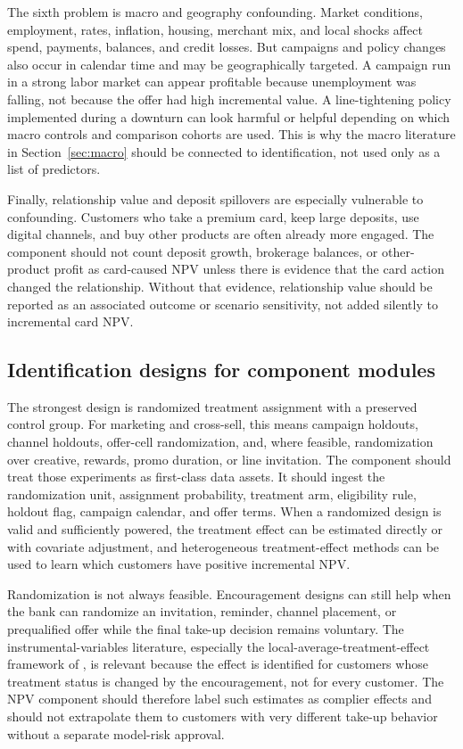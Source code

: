 \documentclass[11pt]{article}
\newcommand{\1}{\mathbf{1}}
\begin{document}
The sixth problem is macro and geography confounding. Market conditions,
employment, rates, inflation, housing, merchant mix, and local shocks affect
spend, payments, balances, and credit losses. But campaigns and policy changes
also occur in calendar time and may be geographically targeted. A campaign run
in a strong labor market can appear profitable because unemployment was falling,
not because the offer had high incremental value. A line-tightening policy
implemented during a downturn can look harmful or helpful depending on which
macro controls and comparison cohorts are used. This is why the macro
literature in Section~\ref{sec:macro} should be connected to identification,
not used only as a list of predictors.

Finally, relationship value and deposit spillovers are especially vulnerable
to confounding. Customers who take a premium card, keep large deposits, use
digital channels, and buy other products are often already more engaged. The
component should not count deposit growth, brokerage balances, or other-product
profit as card-caused NPV unless there is evidence that the card action changed
the relationship. Without that evidence, relationship value should be reported
as an associated outcome or scenario sensitivity, not added silently to
incremental card NPV.

\subsection{Identification designs for component modules}

The strongest design is randomized treatment assignment with a preserved
control group. For marketing and cross-sell, this means campaign holdouts,
channel holdouts, offer-cell randomization, and, where feasible, randomization
over creative, rewards, promo duration, or line invitation. The component
should treat those experiments as first-class data assets. It should ingest the
randomization unit, assignment probability, treatment arm, eligibility rule,
holdout flag, campaign calendar, and offer terms. When a randomized design is
valid and sufficiently powered, the treatment effect can be estimated directly
or with covariate adjustment, and heterogeneous treatment-effect methods can be
used to learn which customers have positive incremental NPV.

Randomization is not always feasible. Encouragement designs can still help
when the bank can randomize an invitation, reminder, channel placement, or
prequalified offer while the final take-up decision remains voluntary. The
instrumental-variables literature, especially the local-average-treatment-effect
framework of \citet{angristimbensrubin1996iv}, is relevant because the effect
is identified for customers whose treatment status is changed by the
encouragement, not for every customer. The NPV component should therefore label
such estimates as complier effects and should not extrapolate them to customers
with very different take-up behavior without a separate model-risk approval.
\end{document}
